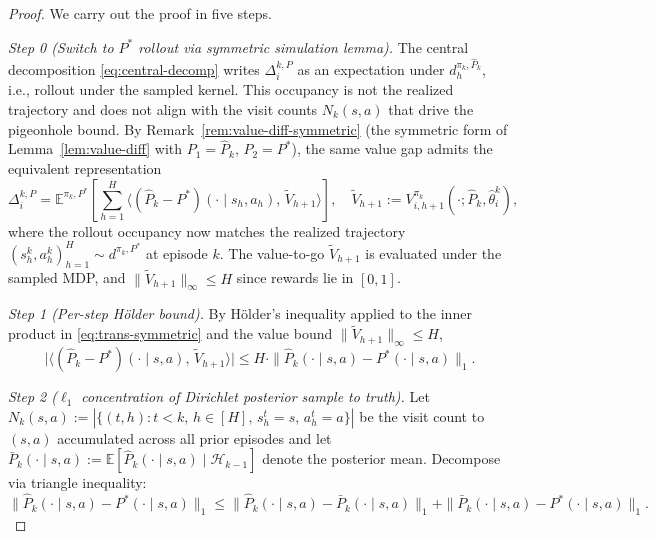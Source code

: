\begin{proof}
We carry out the proof in five steps.

\textit{Step 0 (Switch to $P^*$ rollout via symmetric simulation lemma).} The central decomposition \eqref{eq:central-decomp} writes $\Delta_i^{k,P}$ as an expectation under $d_h^{\pi_k, \hat{P}_k}$, i.e., rollout under the sampled kernel. This occupancy is not the realized trajectory and does not align with the visit counts $N_k(s, a)$ that drive the pigeonhole bound. By Remark~\ref{rem:value-diff-symmetric} (the symmetric form of Lemma~\ref{lem:value-diff} with $P_1 = \hat{P}_k$, $P_2 = P^*$), the same value gap admits the equivalent representation
\begin{equation}
\label{eq:trans-symmetric}
\Delta_i^{k,P} = \mathbb{E}^{\pi_k, P^*}\left[\sum_{h=1}^H \big\langle (\hat{P}_k - P^*)(\cdot \mid s_h, a_h),\, \widetilde{V}_{h+1}\big\rangle\right], \quad \widetilde{V}_{h+1} := V_{i,h+1}^{\pi_k}(\cdot; \hat{P}_k, \hat{\theta}_i^k),
\end{equation}
where the rollout occupancy now matches the realized trajectory $(s_h^k, a_h^k)_{h=1}^H \sim d^{\pi_k, P^*}$ at episode $k$. The value-to-go $\widetilde{V}_{h+1}$ is evaluated under the sampled MDP, and $\|\widetilde{V}_{h+1}\|_\infty \leq H$ since rewards lie in $[0, 1]$.

\textit{Step 1 (Per-step Hölder bound).} By Hölder's inequality applied to the inner product in \eqref{eq:trans-symmetric} and the value bound $\|\widetilde{V}_{h+1}\|_\infty \leq H$,
\begin{equation}
\label{eq:step1-holder}
\big|\big\langle (\hat{P}_k - P^*)(\cdot \mid s, a),\, \widetilde{V}_{h+1}\big\rangle\big| \leq H \cdot \|\hat{P}_k(\cdot \mid s, a) - P^*(\cdot \mid s, a)\|_1.
\end{equation}

\textit{Step 2 ($\ell_1$ concentration of Dirichlet posterior sample to truth).} Let $N_k(s, a) := |\{(t, h) : t < k,\, h \in [H],\, s_h^t = s,\, a_h^t = a\}|$ be the visit count to $(s, a)$ accumulated across all prior episodes and let $\bar{P}_k(\cdot \mid s, a) := \mathbb{E}[\hat{P}_k(\cdot \mid s, a) \mid \mathcal{H}_{k-1}]$ denote the posterior mean. Decompose via triangle inequality:
\begin{equation}
\label{eq:triangle-decomp}
\|\hat{P}_k(\cdot \mid s, a) - P^*(\cdot \mid s, a)\|_1 \leq \|\hat{P}_k(\cdot \mid s, a) - \bar{P}_k(\cdot \mid s, a)\|_1 + \|\bar{P}_k(\cdot \mid s, a) - P^*(\cdot \mid s, a)\|_1.
\end{equation}


\end{proof}
